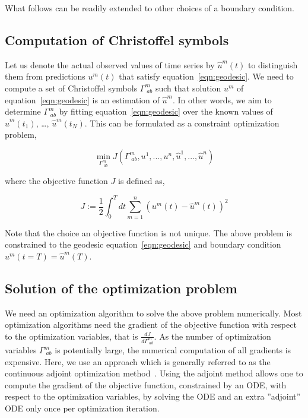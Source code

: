 \documentclass[a4paper,11pt]{elsarticle}
\begin{document}
What follows can be readily extended to other choices of a boundary
condition. 

\subsection{Computation of Christoffel symbols}
\label{subsection:optimization-problem}

Let us denote the actual observed values of time series by
$\hat{u}^{m}(t)$ to distinguish them from predictions $u^{m}(t)$ that
satisfy equation~\ref{eqn:geodesic}. We need to compute a set of
Christoffel symbols $\Gamma^{m}_{\;ab}$ such that solution $u^{m}$ of
equation~\ref{eqn:geodesic} is an estimation of $\hat{u}^{m}$. In
other words, we aim to determine $\Gamma^{m}_{\;ab}$ by fitting
equation~\ref{eqn:geodesic} over the known values of
$\hat{u}^{m}(t_{1})$, \dots, $\hat{u}^{m}(t_{N})$. This can be
formulated as a constraint optimization problem,

\begin{equation}\label{eqn:optimization-problem}
\min_{\Gamma^{m}_{\;ab}}
J(\Gamma^{m}_{\;ab},u^{1},...,u^{n},\hat{u}^{1},...,\hat{u}^{n})
\end{equation}

where the objective function $J$ is defined as,

\begin{equation}\label{eqn:optimization-objective-raw}
J := \frac{1}{2} \int_{0}^{T} dt \sum_{m=1}^{n} (u^{m}(t) -
\hat{u}^{m}(t))^2
\end{equation}

Note that the choice an objective function is not unique. The above
problem is constrained to the geodesic equation~\ref{eqn:geodesic} and
boundary condition $u^{m}(t = T) = \hat{u}^{m}(T)$.

\subsection{Solution of the optimization problem}
\label{subsection:adjoint-method}

We need an optimization algorithm to solve the above problem
numerically. Most optimization algorithms need the gradient of the
objective function with respect to the optimization variables, that is
$\frac{dJ}{d \Gamma^{m}_{\;ab}}$. As the number of optimization variables
$\Gamma^{m}_{\;ab}$ is potentially large, the numerical computation of
all gradients is expensive. Here, we use an approach which is
generally referred to as the continuous adjoint optimization
method~\cite{ref:adjoint-giles}. Using the adjoint method allows one
to compute the gradient of the objective function, constrained by an
ODE, with respect to the optimization variables, by solving the ODE
and an extra ''adjoint'' ODE only once per optimization iteration.
\end{document}
